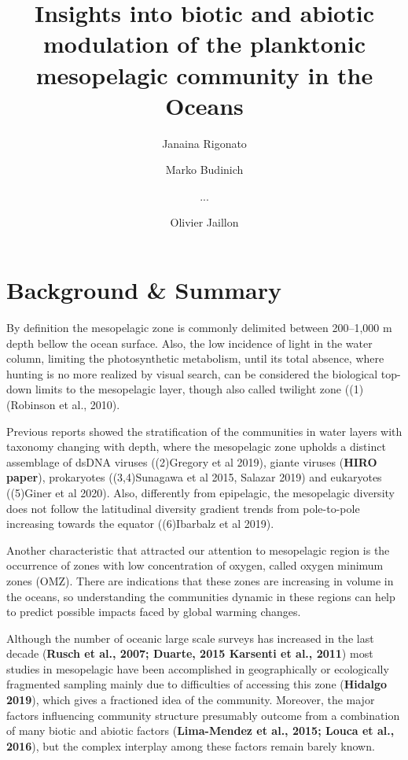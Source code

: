 \documentclass[fleqn,10pt]{wlscirep}
\title{Insights into biotic and abiotic modulation of the planktonic mesopelagic community in the Oceans}
\author[1,$\dag$]{Janaina Rigonato}
\author[2,$\dag$]{Marko Budinich}
\author[1,2]{...}
\author[1,*]{Olivier Jaillon}
\affil[1]{Genoscope, department, Evry, postcode, country}
\affil[2]{GO-SEE, department, Roscoff, postcode, country}
\affil[*]{corresponding author(s): Olivier Jaillon (corresponding.author@email.example)}
\affil[$\dag$]{these authors contributed equally to this work}
\begin{document}
\flushbottom
\maketitle

\thispagestyle{empty}



\section*{Background \& Summary}

By definition the mesopelagic zone is commonly delimited between 200–1,000 m depth bellow the ocean surface. Also, the low incidence of light in the water column, limiting the photosynthetic metabolism, until its total absence, where hunting is no more realized by visual search, can be considered the biological top-down limits to the mesopelagic layer, though also called twilight zone ((1)(Robinson et al., 2010).

Previous reports showed the stratification of the communities in water layers with taxonomy changing with depth, where the mesopelagic zone upholds a distinct assemblage  of dsDNA viruses ((2)Gregory et al 2019), giante viruses (\textbf{HIRO paper}), prokaryotes ((3,4)Sunagawa et al 2015, Salazar 2019) and eukaryotes ((5)Giner et al 2020). Also, differently from epipelagic, the mesopelagic diversity does not follow the latitudinal diversity gradient trends from pole-to-pole increasing towards the equator ((6)Ibarbalz et al 2019).

Another characteristic that attracted our attention to mesopelagic region is the occurrence of zones with low concentration of oxygen, called oxygen minimum zones (OMZ). There are indications that these zones are increasing in volume in the oceans, so understanding the communities dynamic in these regions can help to predict possible impacts faced by global warming changes.

Although the number of oceanic large scale surveys has increased in the last decade (\textbf{Rusch et al., 2007; Duarte, 2015 Karsenti et al., 2011}) most studies in mesopelagic have been accomplished in geographically or ecologically fragmented sampling mainly due to difficulties of accessing this zone (\textbf{Hidalgo 2019}), which gives a fractioned idea of the community. Moreover, the major factors influencing community structure presumably outcome from a combination of many biotic and abiotic factors (\textbf{Lima-Mendez et al., 2015; Louca et al., 2016}), but the complex interplay among these factors remain barely known.
\end{document}
